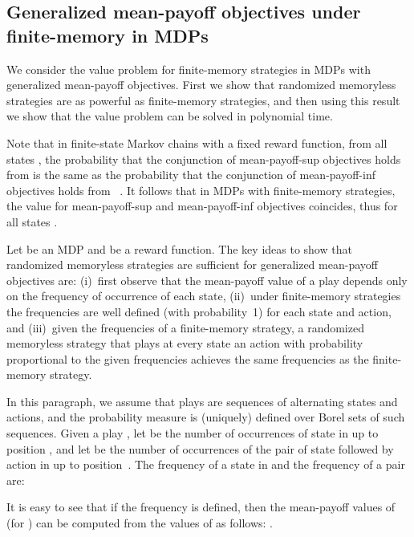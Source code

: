 \documentclass{article}
\begin{document}
\subsection{Generalized mean-payoff objectives under finite-memory in MDPs}

We consider the value problem for finite-memory strategies
in MDPs with generalized mean-payoff objectives. 
First we show that randomized memoryless strategies are as powerful as 
finite-memory strategies, and then using this result we show that the 
value problem can be solved in polynomial time.

Note that in finite-state Markov chains with a fixed reward function, from all states , 
the probability that the conjunction  of mean-payoff-sup objectives holds from  is 
the same as the probability that the conjunction  of mean-payoff-inf objectives holds 
from ~\cite{FV97}. It follows that in MDPs with finite-memory strategies, the 
value for mean-payoff-sup and mean-payoff-inf objectives coincides, thus
 for all states .


\smallskip{}
Let  be an MDP and 
be a reward function. The key ideas to show that randomized memoryless strategies
are sufficient for generalized mean-payoff objectives are: (i)~first observe that the mean-payoff value of a play depends only on the frequency of 
occurrence of each state, (ii)~under finite-memory strategies the frequencies are well defined 
(with probability~1) for each state and action, and (iii)~given the frequencies of a
finite-memory strategy, a randomized memoryless strategy that plays at every state an 
action with probability proportional to the given frequencies achieves the same frequencies
as the finite-memory strategy.


\smallskip{}
In this paragraph, we assume that plays are sequences of alternating
states and actions, and the probability measure 
is (uniquely) defined over Borel sets of such sequences.
Given a play , let  be the 
number of occurrences of state  in  up to position , and
let  be the number of occurrences of the pair  of state 
followed by action  in  up to position~.
The frequency  of a state  in  and 
the frequency  of a pair  are:
 


\smallskip{}
It is easy to see that if the frequency  is defined, then 
the mean-payoff values 
of  (for ) can be computed from the values of 
as follows: .
\end{document}
